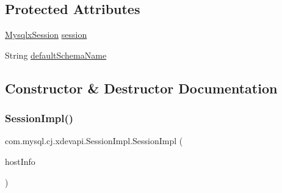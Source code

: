 \subsection*{Protected Attributes}
\begin{DoxyCompactItemize}
\item 
\mbox{\hyperlink{classcom_1_1mysql_1_1cj_1_1_mysqlx_session}{Mysqlx\+Session}} \mbox{\hyperlink{classcom_1_1mysql_1_1cj_1_1xdevapi_1_1_session_impl_a24bb736eef317972feb7dfeaad760f82}{session}}
\item 
String \mbox{\hyperlink{classcom_1_1mysql_1_1cj_1_1xdevapi_1_1_session_impl_adce486defa0eedb92c66d0a7daf58551}{default\+Schema\+Name}}
\end{DoxyCompactItemize}


\subsection{Constructor \& Destructor Documentation}
\mbox{\label{classcom_1_1mysql_1_1cj_1_1xdevapi_1_1_session_impl_accebe952a26b96f742b99bdbcfcd27f7}} 
\subsubsection{\texorpdfstring{Session\+Impl()}{SessionImpl()}\hspace{0.1cm}{\footnotesize\ttfamily [1/2]}}
{\footnotesize\ttfamily com.\+mysql.\+cj.\+xdevapi.\+Session\+Impl.\+Session\+Impl (\begin{DoxyParamCaption}\item[{\mbox{\hyperlink{classcom_1_1mysql_1_1cj_1_1conf_1_1_host_info}{Host\+Info}}}]{host\+Info }\end{DoxyParamCaption})}

\mbox{\label{classcom_1_1mysql_1_1cj_1_1xdevapi_1_1_session_impl_aafbc9f570d539e57379332bb227257b0}} 
